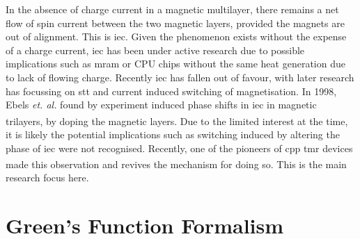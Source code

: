 \documentclass[a4paper, 12pt]{article}
\newcommand{\site}[1]{\textsuperscript{\textcolor{blue}{\cite{#1}}}}
\begin{document}
	\par In the absence of charge current in a magnetic multilayer, there remains a net flow of spin current between the two magnetic layers, provided the magnets are out of alignment. This is \gls{iec}. Given the phenomenon exists without the expense of a charge current, \gls{iec} has been under active research due to possible implications such as \gls{mram} or CPU chips without the same heat generation due to lack of flowing charge. Recently \gls{iec} has fallen out of favour, with later research has focussing on \gls{stt} and current induced switching of magnetisation. In 1998, Ebels \textit{et. al.} found by experiment induced phase shifts in \gls{iec} in magnetic trilayers, by doping the magnetic layers\site{ebels}. Due to the limited interest at the time, it is likely the potential implications such as switching induced by altering the phase of \gls{iec} were not recognised. Recently, one of the pioneers of \gls{cpp} \gls{tmr} devices made this observation and revives the mechanism for doing so\textsuperscript{\textcolor{blue}{\cite{AUphase}}}. This is the main research focus here.
	\section{Green's Function Formalism}
\end{document}
